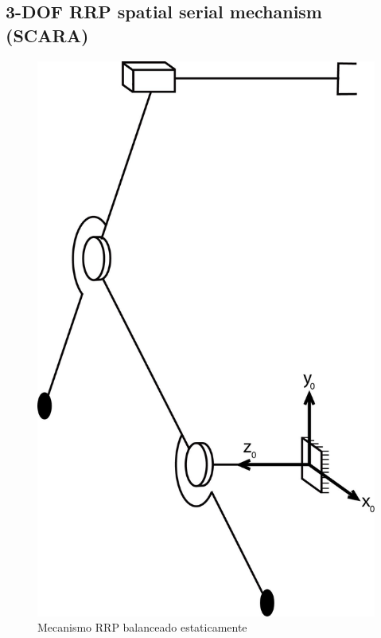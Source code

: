\documentclass[a4paper,11pt,brazil,fleqn]{article}
\begin{document}
\subsection{3-DOF RRP spatial serial mechanism (SCARA)} \label{S03-2}

\begin{figure}[H]
	\centering
	\includegraphics[scale=0.11]{RRP.jpg}  
	\caption{Mecanismo RRP balanceado estaticamente}
	\label{fig:RRP}
\end{figure}
\end{document}
